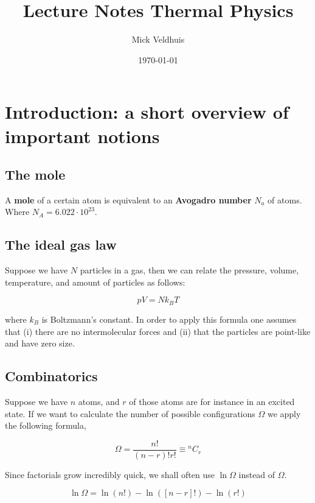 \documentclass[a4paper]{article}
\title{Lecture Notes Thermal Physics}
\author{Mick Veldhuis}
\date{\today}
\begin{document}
\maketitle

\tableofcontents

\section{Introduction: a short overview of important notions}

\subsection*{The mole}

A \textbf{mole} of a certain atom is equivalent to an \textbf{Avogadro number} $N_a$ of atoms. Where $N_A=6.022\cdot 10^{23}$.

\subsection*{The ideal gas law}

Suppose we have $N$ particles in a gas, then we can relate the pressure, volume, temperature, and amount of particles as follows:

\begin{equation}
	pV=Nk_BT
\end{equation}

where $k_B$ is Boltzmann's constant. In order to apply this formula one assumes that (i) there are no intermolecular forces and (ii) that the particles are point-like and have zero size. 

\subsection*{Combinatorics}

Suppose we have $n$ atoms, and $r$ of those atoms are for instance in an excited state. If we want to calculate the number of possible configurations $\Omega$ we apply the following formula,

\begin{equation}
	\Omega=\frac{n!}{(n-r)!r!}\equiv {}^nC_r
\end{equation}

Since factorials grow incredibly quick, we shall often use $\ln\Omega$ instead of $\Omega$. 

\begin{equation}
	\ln\Omega=\ln(n!)-\ln([n-r]!)-\ln(r!)
\end{equation}
\end{document}
